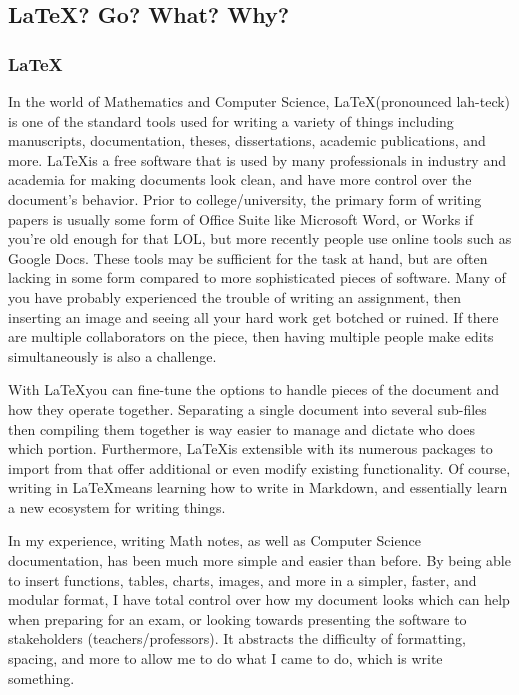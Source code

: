 \subsection{\LaTeX? Go? What? Why?}

\subsubsection{\LaTeX}

In the world of Mathematics and Computer Science, \LaTeX (pronounced
lah-teck) is one of
the standard tools used for writing a variety of things including
manuscripts, documentation, theses, dissertations, academic
publications, and more.
\LaTeX is a free software that is used by
many professionals in industry and academia for making documents look
clean, and have more control over the document's behavior.
Prior to college/university, the primary form of writing papers is
usually some form of Office Suite like Microsoft Word, or Works if
you're old enough for that LOL, but more recently people use online
tools such as Google Docs.
These tools may be sufficient for the task at hand, but are often
lacking in some form compared to more sophisticated pieces of software.
Many of you have probably experienced the trouble of writing an
assignment, then inserting an image and seeing all your hard work get
botched or ruined.
If there are multiple collaborators on the piece, then having
multiple people make edits simultaneously is also a challenge.

With \LaTeX you can fine-tune the options to handle pieces of the
document and how they operate together.
Separating a single document into several sub-files then compiling
them together is way easier to manage and dictate who does which portion.
Furthermore, \LaTeX is extensible with its numerous packages to
import from that offer additional or even modify existing functionality.
Of course, writing in \LaTeX means learning how to write in Markdown,
and essentially learn a new ecosystem for writing things.

In my experience, writing Math notes, as well as Computer Science
documentation, has been much more simple and easier than before.
By being able to insert functions, tables, charts, images, and more
in a simpler, faster, and modular format, I have total control over how my
document looks which can help when preparing for an exam, or looking
towards presenting the software to stakeholders
(teachers/professors). It abstracts the
difficulty of formatting, spacing, and more to allow me to do what I
came to do, which is write something.

